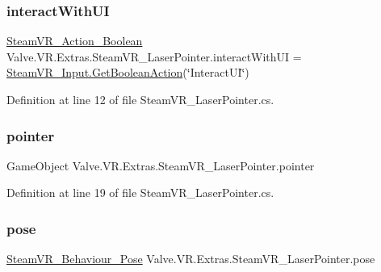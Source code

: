 \subsubsection{\texorpdfstring{interactWithUI}{interactWithUI}}
{\footnotesize\ttfamily \mbox{\hyperlink{class_valve_1_1_v_r_1_1_steam_v_r___action___boolean}{Steam\+V\+R\+\_\+\+Action\+\_\+\+Boolean}} Valve.\+V\+R.\+Extras.\+Steam\+V\+R\+\_\+\+Laser\+Pointer.\+interact\+With\+UI = \mbox{\hyperlink{class_valve_1_1_v_r_1_1_steam_v_r___input_a1442b5592282c75d7caeb91fe3509124}{Steam\+V\+R\+\_\+\+Input.\+Get\+Boolean\+Action}}(\char`\"{}Interact\+UI\char`\"{})}



Definition at line 12 of file Steam\+V\+R\+\_\+\+Laser\+Pointer.\+cs.

\mbox{\label{class_valve_1_1_v_r_1_1_extras_1_1_steam_v_r___laser_pointer_af3e7567e70ead825a1a0d21ade26585b}} 
\subsubsection{\texorpdfstring{pointer}{pointer}}
{\footnotesize\ttfamily Game\+Object Valve.\+V\+R.\+Extras.\+Steam\+V\+R\+\_\+\+Laser\+Pointer.\+pointer}



Definition at line 19 of file Steam\+V\+R\+\_\+\+Laser\+Pointer.\+cs.

\mbox{\label{class_valve_1_1_v_r_1_1_extras_1_1_steam_v_r___laser_pointer_ab909a8ae437363a55c393d24c1341b3d}} 
\subsubsection{\texorpdfstring{pose}{pose}}
{\footnotesize\ttfamily \mbox{\hyperlink{class_valve_1_1_v_r_1_1_steam_v_r___behaviour___pose}{Steam\+V\+R\+\_\+\+Behaviour\+\_\+\+Pose}} Valve.\+V\+R.\+Extras.\+Steam\+V\+R\+\_\+\+Laser\+Pointer.\+pose}



